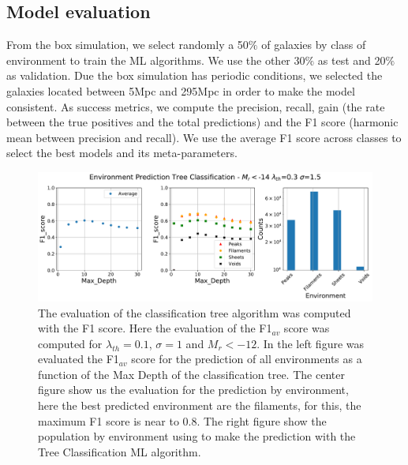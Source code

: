 \documentclass[usenatbib]{mnras}
\begin{document}
\subsection{Model evaluation}

From the box simulation, we select randomly a 50$\%$ of galaxies by class of environment to train the ML algorithms. We use the other 30$\%$ as test and  20$\%$ as validation. Due the box simulation has periodic conditions, we selected the galaxies located between 5Mpc and 295Mpc in order to make the model consistent.  
As success metrics, we compute the precision, recall, gain (the rate between the true positives
and the total predictions) and the F1 score (harmonic mean between precision and recall).
We use the average F1 score across classes to select the best models and its meta-parameters.

\begin{figure}
    \includegraphics[scale=0.45]{Figs/p_F1_EnvPredTreeClass.pdf}
    \caption{The evaluation of the classification tree algorithm was computed with the F1 score. Here the evaluation of the F1$_{av}$ score was computed for $\lambda_{th}=0.1$, $\sigma=1$ and $M_r<-12$.  In the left figure was evaluated the F1$_{av}$ score for the prediction of all environments as a function of the Max Depth of the classification tree. The center figure show us the evaluation for the prediction by environment, here the best predicted environment are the filaments, for this, the maximum F1 score is near to 0.8. The right figure show the population by environment using to make the prediction with the Tree Classification ML algorithm.}
    \label{fig:F1_curve}
\end{figure}
\end{document}
